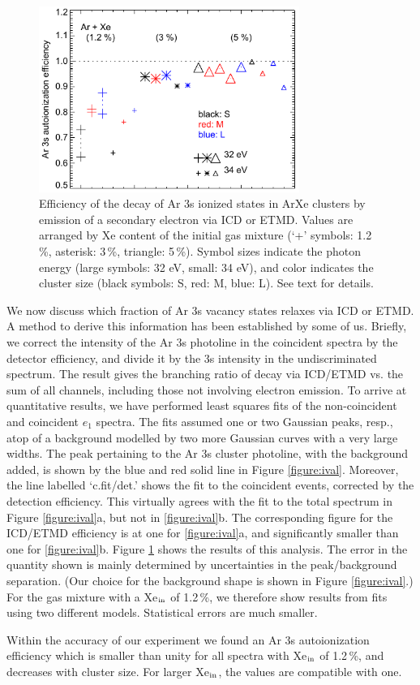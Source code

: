\begin{figure}[ht]
 \centering
 \includegraphics[width=8.5cm]{pics/figure_eff.pdf}
 \caption{
Efficiency of the decay of Ar 3s ionized states in ArXe clusters by emission of a secondary electron via ICD or ETMD. Values are arranged by Xe content of the initial gas mixture (`+' symbols: 1.2\,\%, asterisk: 3\,\%, triangle: 5\,\%). Symbol sizes indicate the photon energy (large symbols: 32 eV, small: 34 eV), and color indicates the cluster size (black symbols: S, red: M, blue: L). See text for details.
}
 \label{figure:eff}
\end{figure}
%
We now discuss which fraction of Ar 3s vacancy states relaxes via ICD or ETMD.
A method to derive this information has been established by some of us.\cite{foerstel_2013}
Briefly, we correct the intensity of the Ar 3s photoline in the coincident spectra by the detector efficiency, and divide it by the 3s intensity in the undiscriminated spectrum.
The result gives the branching ratio of decay via ICD/ETMD vs. the sum of all channels, including those not involving electron emission.
To arrive at quantitative results, we have performed least squares fits of the non-coincident and coincident $e_1$ spectra.
The fits assumed one or two Gaussian peaks, resp., atop of a background modelled by two more Gaussian curves with a very large widths.
The peak pertaining to the Ar 3s cluster photoline, with the background added, is shown by the blue and red solid line in Figure \ref{figure:ival}.
Moreover, the line labelled `c.fit/det.' shows the fit to the coincident events, corrected by the detection efficiency. 
This virtually agrees with the fit to the total spectrum in Figure \ref{figure:ival}a, but not in \ref{figure:ival}b. The corresponding figure for the ICD/ETMD efficiency is at one for \ref{figure:ival}a, and significantly smaller than one for \ref{figure:ival}b.
Figure \ref{figure:eff} shows the results of this analysis.
The error in the quantity shown is mainly determined by uncertainties in the peak/background separation.
(Our choice for the background shape is shown in Figure \ref{figure:ival}.)
For the gas mixture with a Xe$_{\rm in}$ of 1.2\,\%, we therefore show results from fits using two different models.
Statistical errors are much smaller.

Within the accuracy of our experiment we found an Ar 3s autoionization efficiency which is smaller than unity for all spectra with Xe$_{\rm in}$ of 1.2\,\%, and decreases with cluster size. 
For larger Xe$_{\rm in}$, the values are compatible with one.